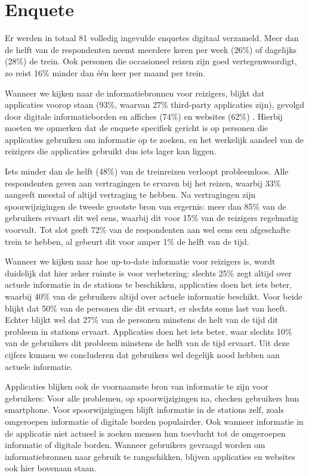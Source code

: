 \section{Enquete}
Er werden in totaal 81 volledig ingevulde enquetes digitaal verzameld. Meer dan de helft van de respondenten neemt meerdere keren per week (26\%) of dagelijks (28\%) de trein. Ook personen die occasioneel reizen zijn goed vertegenwoordigt, zo reist 16\% minder dan één keer per maand per trein.

Wanneer we kijken naar de informatiebronnen voor reizigers, blijkt dat  applicaties voorop staan (93\%, waarvan 27\% third-party applicaties zijn), gevolgd door digitale informatieborden en affiches (74\%) en websites (62\%) . Hierbij moeten we opmerken dat de enquete specifiek gericht is op personen die applicaties gebruiken om informatie op te zoeken, en het werkelijk aandeel van de reizigers die applicaties gebruikt dus iets lager kan liggen.

Iets minder dan de helft (48\%) van de treinreizen verloopt probleemloos. Alle respondenten geven aan vertragingen te ervaren bij het reizen, waarbij 33\% aangeeft meestal of altijd vertraging te hebben. Na vertragingen zijn spoorwijzigingen de tweede grootste bron van ergernis: meer dan 85\% van de gebruikers ervaart dit wel eens, waarbij dit voor 15\% van de reizigers regelmatig voorvalt. Tot slot geeft 72\% van de respondenten aan wel eens een afgeschafte trein te hebben, al gebeurt dit voor amper 1\% de helft van de tijd.

Wanneer we kijken naar hoe up-to-date informatie voor reizigers is, wordt duidelijk dat hier zeker ruimte is voor verbetering: slechts 25\% zegt altijd over actuele informatie in de stations te beschikken, applicaties doen het iets beter, waarbij 40\% van de gebruikers altijd over actuele informatie beschikt. Voor beide blijkt dat 50\% van de personen die dit ervaart, er slechts soms last van heeft. Echter blijkt wel dat 27\% van de personen minstens de helt van de tijd dit probleem in stations ervaart. Applicaties doen het iets beter, waar slechts 10\% van de gebruikers dit probleem minstens de helft van de tijd ervaart. Uit deze cijfers kunnen we concluderen dat gebruikers wel degelijk nood hebben aan actuele informatie. 

Applicaties blijken ook de voornaamste bron van informatie te zijn voor gebruikers: Voor alle problemen, op spoorwijzigingen na, checken gebruikers hun smartphone. Voor spoorwijzigingen blijft informatie in de stations zelf, zoals omgeroepen informatie of digitale borden populairder. Ook wanneer informatie in de applicatie niet actueel is zoeken mensen hun toevlucht tot de omgeroepen informatie of digitale borden. Wanneer gebruikers gevraagd worden om informatiebronnen naar gebruik te rangschikken, blijven applicaties en websites ook hier bovenaan staan.

